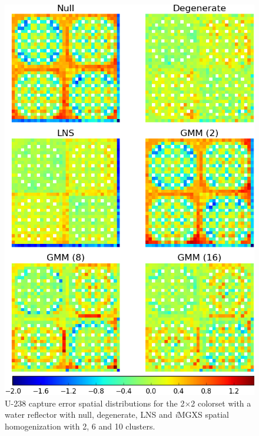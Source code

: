 \begin{figure}[h!]
\centering
\includegraphics[width=0.9\linewidth]{figures/results/spatial/reflector/capt-err}
\vspace{2mm}
\caption[U-238 capture errors for the 2$\times$2 colorset with reflector]{U-238 capture error spatial distributions for the 2$\times$2 colorset with a water reflector with null, degenerate, \ac{LNS} and \textit{i}\ac{MGXS} spatial homogenization with 2, 6 and 10 clusters.}
\label{fig:chap11-refl-capt-err}
\end{figure}

\clearpage

